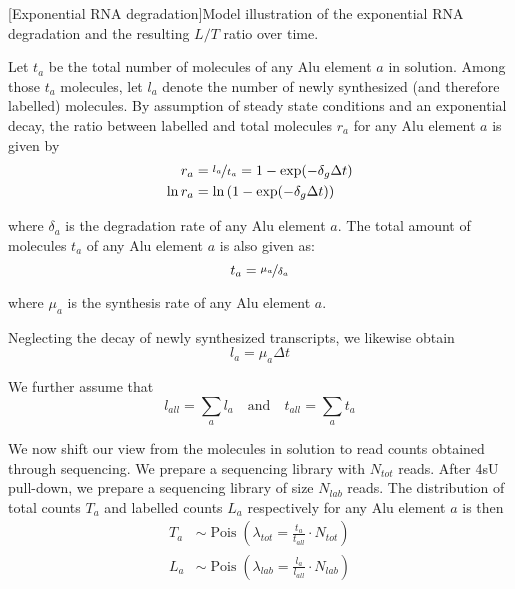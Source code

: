 \bigbreak
\noindent\begin{minipage}{\textwidth}
\centering

\vspace{-\ht\strutbox}
[Exponential RNA degradation]{Model illustration of the
exponential RNA degradation and the resulting $L/T$ ratio over time.}
\label{fig:expdecay}
\end{minipage}
\bigbreak

\noindent Let $t_{a}$ be the total number of molecules of any Alu element $a$ in
solution. Among those $t_{a}$ molecules, let $l_{a}$ denote the number of newly
synthesized (and therefore labelled) molecules. By assumption of steady state
conditions and an exponential decay, the ratio between labelled and total
molecules $r_{a}$ for any Alu element $a$ is given by
\begin{align*}
   r_{a}     &= \nicefrac{l_{a}}{t_{a}}=1-\exp(-\delta_{g}\Delta t)
\\ \ln r_{a} &= \ln\left(1-\exp(-\delta_{g}\Delta t)\right)
\end{align*}

\noindent where $\delta_{a}$ is the degradation rate of any Alu element $a$. The
total amount of molecules $t_{a}$ of any Alu element $a$ is also given as:
\begin{equation*}
t_{a}=\nicefrac{\mu_{a}}{\delta_{a}}
\end{equation*}

\noindent where $\mu_{a}$ is the synthesis rate of any Alu element $a$.

\noindent{}Neglecting the
decay of newly synthesized transcripts, we likewise obtain
\begin{equation*}
l_{a}=\mu_{a}\Delta t
\end{equation*}

\noindent We further assume that
\begin{equation*}
l_{all}=\sum_{a}l_{a}\quad\text{and}\quad t_{all}=\sum_{a}t_{a}
\end{equation*}

\noindent We now shift our view from the molecules in solution to read counts
obtained through sequencing. We prepare a sequencing library with $N_{tot}$
reads. After 4sU pull-down, we prepare a sequencing library of size $N_{lab}$
reads. The distribution of total counts $T_{a}$ and labelled counts $L_{a}$
respectively for any Alu element $a$ is then
\begin{align*}
   T_{a} &\sim \operatorname{Pois}
   (\lambda_{tot}=\frac{t_{a}}{t_{all}}\cdot N_{tot})
\\ L_{a} &\sim \operatorname{Pois}
   (\lambda_{lab}=\frac{l_{a}}{l_{all}}\cdot N_{lab})
\end{align*}

